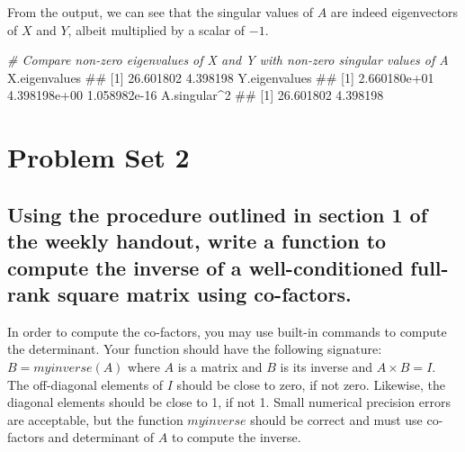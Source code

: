\documentclass[]{article}
\newenvironment{Shaded}{\begin{snugshade}}{\end{snugshade}}
\newcommand{\DecValTok}[1]{\textcolor[rgb]{0.00,0.00,0.81}{#1}}
\newcommand{\CommentTok}[1]{\textcolor[rgb]{0.56,0.35,0.01}{\textit{#1}}}
\newcommand{\OperatorTok}[1]{\textcolor[rgb]{0.81,0.36,0.00}{\textbf{#1}}}
\newcommand{\NormalTok}[1]{#1}
\begin{document}
From the output, we can see that the singular values of \(A\) are indeed
eigenvectors of \(X\) and \(Y\), albeit multiplied by a scalar of
\(-1\).

\begin{Shaded}
\begin{Highlighting}[]
\CommentTok{# Compare non-zero eigenvalues of X and Y with non-zero singular values of A}
\NormalTok{X.eigenvalues}
\NormalTok{## [1] 26.601802  4.398198}
\NormalTok{Y.eigenvalues}
\NormalTok{## [1] 2.660180e+01 4.398198e+00 1.058982e-16}
\NormalTok{A.singular}\OperatorTok{^}\DecValTok{2}
\NormalTok{## [1] 26.601802  4.398198}
\end{Highlighting}
\end{Shaded}

\section{Problem Set 2}\label{problem-set-2}

\subsection{Using the procedure outlined in section 1 of the weekly
handout, write a function to compute the inverse of a well-conditioned
full-rank square matrix using
co-factors.}\label{using-the-procedure-outlined-in-section-1-of-the-weekly-handout-write-a-function-to-compute-the-inverse-of-a-well-conditioned-full-rank-square-matrix-using-co-factors.}

In order to compute the co-factors, you may use built-in commands to
compute the determinant. Your function should have the following
signature: \(B = myinverse(A)\) where \(A\) is a matrix and \(B\) is its
inverse and \(A \times B = I\). The off-diagonal elements of \(I\)
should be close to zero, if not zero. Likewise, the diagonal elements
should be close to 1, if not 1. Small numerical precision errors are
acceptable, but the function \(myinverse\) should be correct and must
use co-factors and determinant of \(A\) to compute the inverse.
\end{document}
